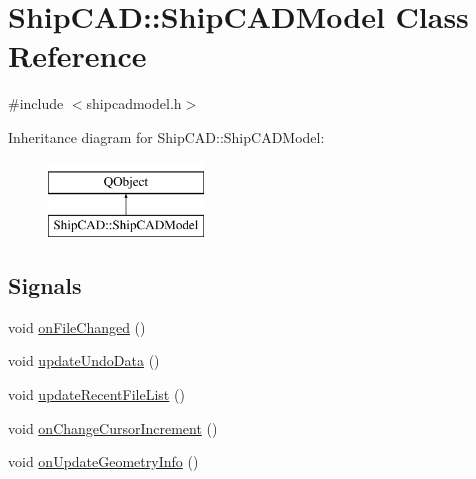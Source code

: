 \hypertarget{classShipCAD_1_1ShipCADModel}{\section{Ship\-C\-A\-D\-:\-:Ship\-C\-A\-D\-Model Class Reference}
\label{classShipCAD_1_1ShipCADModel}
}


{\ttfamily \#include $<$shipcadmodel.\-h$>$}

Inheritance diagram for Ship\-C\-A\-D\-:\-:Ship\-C\-A\-D\-Model\-:\begin{figure}[H]
\begin{center}
\leavevmode
\includegraphics[height=2.000000cm]{classShipCAD_1_1ShipCADModel}
\end{center}
\end{figure}
\subsection*{Signals}
\begin{DoxyCompactItemize}
\item 
void \hyperlink{classShipCAD_1_1ShipCADModel_ab1aed79b8aa1de37e47b73895d0109a2}{on\-File\-Changed} ()
\item 
void \hyperlink{classShipCAD_1_1ShipCADModel_a67e2bacab21ee04409e3b33693b7ae92}{update\-Undo\-Data} ()
\item 
void \hyperlink{classShipCAD_1_1ShipCADModel_a0a93194fdd11a446daaf5e5354d8928a}{update\-Recent\-File\-List} ()
\item 
void \hyperlink{classShipCAD_1_1ShipCADModel_a6220a9a190b01f64ff47fedc55bdf8f4}{on\-Change\-Cursor\-Increment} ()
\item 
void \hyperlink{classShipCAD_1_1ShipCADModel_a182524b67e4bd1fcfbf87a23dd9e2002}{on\-Update\-Geometry\-Info} ()
\end{DoxyCompactItemize}
